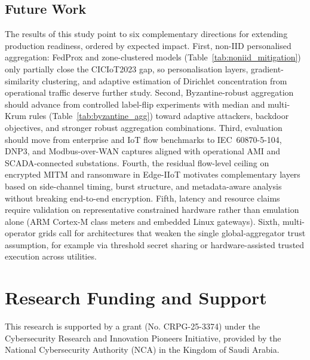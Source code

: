\documentclass[sensors,article,submit,pdftex,moreauthors]{Definitions/mdpi}
\begin{document}
\subsection{Future Work}

The results of this study point to six complementary directions for extending production readiness, ordered by expected impact. First, non-IID personalised aggregation: FedProx and zone-clustered models (Table~\ref{tab:noniid_mitigation}) only partially close the CICIoT2023 gap, so personalisation layers, gradient-similarity clustering, and adaptive estimation of Dirichlet concentration from operational traffic deserve further study. Second, Byzantine-robust aggregation should advance from controlled label-flip experiments with median and multi-Krum rules (Table~\ref{tab:byzantine_agg}) toward adaptive attackers, backdoor objectives, and stronger robust aggregation combinations. Third, evaluation should move from enterprise and IoT flow benchmarks to IEC~60870-5-104, DNP3, and Modbus-over-WAN captures aligned with operational AMI and SCADA-connected substations. Fourth, the residual flow-level ceiling on encrypted MITM and ransomware in Edge-IIoT motivates complementary layers based on side-channel timing, burst structure, and metadata-aware analysis without breaking end-to-end encryption. Fifth, latency and resource claims require validation on representative constrained hardware rather than emulation alone (ARM Cortex-M class meters and embedded Linux gateways). Sixth, multi-operator grids call for architectures that weaken the single global-aggregator trust assumption, for example via threshold secret sharing or hardware-assisted trusted execution across utilities.

\section*{Research Funding and Support} This research is supported by a grant (No. CRPG-25-3374) under the Cybersecurity Research and Innovation Pioneers Initiative, provided by the National Cybersecurity Authority (NCA) in the Kingdom of Saudi Arabia.

\end{document}

